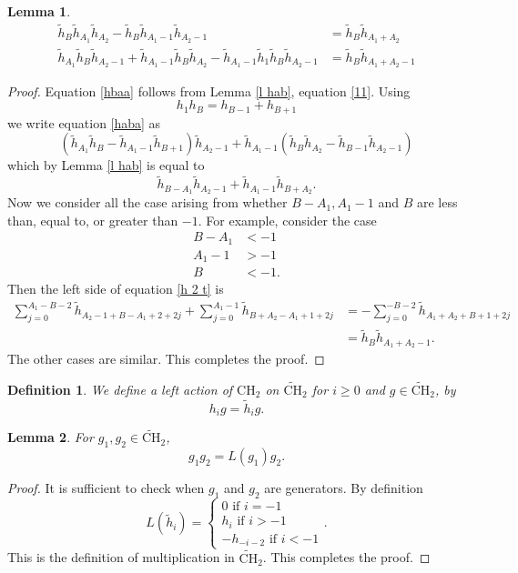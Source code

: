 \documentclass[11pt, oneside]{article}   	%
\newtheorem{lemma}{Lemma}
\newtheorem{definition}{Definition}
\newcommand{\ti}{\tilde{h}}
\newcommand{\tCH}{\tilde{\mathrm{CH}}_2}
\begin{document}
\begin{lemma} \label{l haba} 
\begin{align}
\tilde{h}_B\tilde{h}_{A_1}  \tilde{h}_{A_2} - \tilde{h}_B\tilde{h}_{A_1-1}  \tilde{h}_{A_2-1} &=  \tilde{h}_B\tilde{h}_{A_1+A_2} \label{hbaa}\\
\tilde{h}_{A_1} \tilde{h}_B \tilde{h}_{A_2-1}+ \tilde{h}_{A_1-1} \tilde{h}_B \tilde{h}_{A_2} - \tilde{h}_{A_1-1}\tilde{h}_1 \tilde{h}_B\tilde{h}_{A_2-1} &= \tilde{h}_B\tilde{h}_{A_1+A_2-1} \label{haba}
\end{align}
\end{lemma} 

\begin{proof}
Equation \eqref{hbaa} follows from Lemma \ref{l hab}, equation \eqref{11}. 
Using 
\[
h_1 h_B = h_{B-1}+h_{B+1}
\] 
we write equation \eqref{haba} as 
\[
(\tilde{h}_{A_1} \tilde{h}_B - \tilde{h}_{A_1-1} \tilde{h}_{B+1})\tilde{h}_{A_2-1} + \tilde{h}_{A_1-1} (\tilde{h}_{B} \tilde{h}_{A_2} - \tilde{h}_{B-1} \tilde{h}_{A_2-1}) 
\]
which by Lemma \eqref{l hab} is equal to 
\begin{equation} \label{h 2 t}
\tilde{h}_{B-A_1}\tilde{h}_{A_2-1} + \tilde{h}_{A_1-1} \tilde{h}_{B+A_2}.  
\end{equation}
Now we consider all the case arising from whether $B-A_1, A_1-1$ and $B$ are less than, equal to, or greater than $-1$. For example, consider the case 
\begin{align*} 
B-A_1 &< -1 \\ 
A_1 -1 &> -1 \\ 
B&< -1.
\end{align*}
Then the left side of equation \eqref{h 2 t} is 
\begin{align*}
\sum_{j=0}^{A_1-B-2} \ti_{A_2-1+B-A_1+2+2j} + \sum_{j=0}^{A_1-1} \ti_{B+A_2-A_1+1+2j} &= -\sum_{j=0}^{-B-2} \ti_{A_1+A_2+B+1+2j} \\ 
&= \ti_B \ti_{A_1+A_2-1}.
\end{align*}
The other cases are similar. This completes the proof. 
\end{proof}

\begin{definition} 
We define a left action of $\mathrm{CH}_2$ on $\tilde{\mathrm{CH}}_2$ for $i\geq 0$ and $g \in \tilde{\mathrm{CH}}_2$, by 
\[
h_i g = \ti_i g.
\]
\end{definition} 

\begin{lemma} \label{l action}
For $g_1,g_2 \in \tCH$, 
\[
g_1 g_2 = L(g_1) g_2.
\]
\end{lemma}
\begin{proof}
It is sufficient to check when $g_1$ and $g_2$ are generators. By definition 
\[
L(\ti_i) = \begin{cases} 0 \text{ if } i=-1 \\ 
h_i \text{ if } i > -1 \\ 
-h_{-i-2} \text{ if } i < -1
\end{cases}.
\]
This is the definition of multiplication in $\tCH$. This completes the proof.  
\end{proof}
\end{document}
